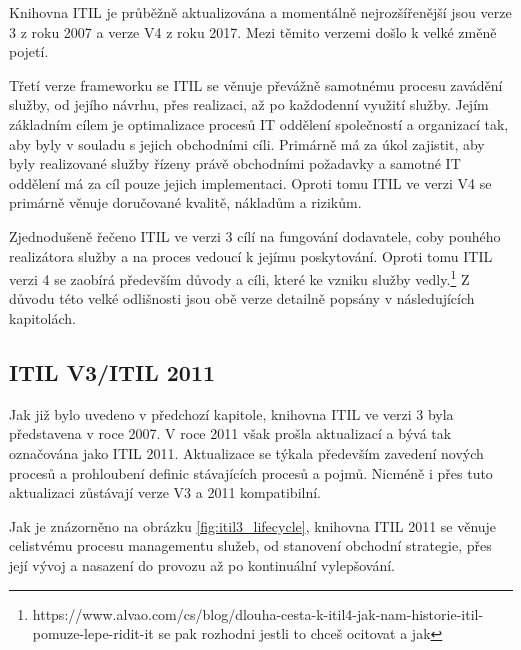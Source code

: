 \documentclass[
  digital,     %
  twoside,     %
  lof,         %
  lot,         %
]{fithesis4}
\begin{document}
Knihovna ITIL je průběžně aktualizována a momentálně nejrozšířenější jsou verze 3 z roku 2007 a verze V4 z roku 2017. Mezi těmito verzemi došlo k velké změně pojetí. 

Třetí verze frameworku se ITIL se věnuje převážně samotnému procesu zavádění služby, od jejího návrhu, přes realizaci, až po každodenní využití služby. Jejím základním cílem je optimalizace procesů IT oddělení společností a organizací tak, aby byly v souladu s jejich obchodními cíli. Primárně má za úkol zajistit, aby byly realizované služby řízeny právě obchodními požadavky a samotné IT oddělení má za cíl pouze jejich implementaci.\parencite[s.~8]{Carlidge2007} Oproti tomu ITIL ve verzi V4 se primárně věnuje doručované kvalitě, nákladům a rizikům. 

Zjednodušeně řečeno ITIL ve verzi 3 cílí na fungování dodavatele, coby pouhého realizátora služby a na proces vedoucí k jejímu poskytování. Oproti tomu ITIL verzi 4 se zaobírá především důvody a cíli, které ke vzniku služby vedly.\footnote{https://www.alvao.com/cs/blog/dlouha-cesta-k-itil4-jak-nam-historie-itil-pomuze-lepe-ridit-it se pak rozhodni jestli to chceš ocitovat a jak}
Z důvodu této velké  odlišnosti jsou obě verze detailně popsány v následujících kapitolách.  
\subsection{ITIL V3/ITIL 2011}
Jak již bylo uvedeno v předchozí kapitole, knihovna ITIL ve verzi 3 byla představena v roce 2007. V roce 2011 však prošla aktualizací a bývá tak označována jako ITIL 2011. Aktualizace se týkala především zavedení nových procesů a prohloubení definic stávajících procesů a pojmů. Nicméně i přes tuto aktualizaci zůstávají verze V3 a 2011 kompatibilní.\parencite{Kempter2722013}

Jak je znázorněno na obrázku \ref{fig:itil3_lifecycle}, knihovna ITIL 2011 se věnuje celistvému procesu managementu služeb, od stanovení obchodní strategie, přes její vývoj a nasazení do provozu až po kontinuální vylepšování. 
  
\end{document}
